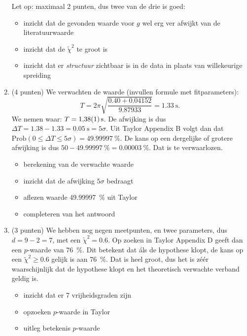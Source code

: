 \documentclass[a4paper,11pt]{article}
\begin{document}
\begin{enumerate}
  Let op: maximaal 2 punten, dus twee van de drie is goed:
  \begin{itemize}
    \item inzicht dat de gevonden waarde voor $g$ wel erg ver afwijkt van de literatuurwaarde
    \item inzicht dat de $\tilde\chi^2$ te groot is
    \item inzicht dat er \emph{structuur} zichtbaar is in de data in plaats van willekeurige spreiding
  \end{itemize}
  \item (4 punten) We verwachten de waarde (invullen formule met fitparameters):
  \begin{equation*}
    T = 2\pi\sqrt{\frac{\num{0,40} + \num{0,04152}}{\num{9,87933}}} = \SI{1,33}{\second}.
  \end{equation*}
  We nemen waar: $T = \SI{1,38 +- 0,01}{\second}$. De afwijking is dus $\Delta T = \num{1,38} - \num{1,33} = \SI{0,05}{\second} = 5\sigma$. Uit Taylor Appendix B volgt dan dat $\text{Prob}(0 \leq \Delta T \leq 5\sigma) = \SI{49,99997}{\percent}.$ De kans op een dergelijke of grotere afwijking is dus $50 - \SI{49,99997}{\percent} = \SI{0,00003}{\percent}$. Dat is te verwaarlozen.
  \begin{itemize}
    \item berekening van de verwachte waarde
    \item inzicht dat de afwijking $5\sigma$ bedraagt
    \item aflezen waarde \SI{49,99997}{\percent} uit Taylor
    \item completeren van het antwoord
  \end{itemize}
  \item (3 punten) We hebben nog negen meetpunten, en twee parameters, dus $d = 9 - 2 = 7$, met een $\tilde\chi^2 = \num{0,6}$. Op zoeken in Taylor Appendix D geeft dan een $p$-waarde van \SI{76}{\percent}. Dit betekent dat áls de hypothese klopt, de kans op een $\tilde\chi^2 \geq \num{0,6}$ gelijk is aan \SI{76}{\percent}. Dat is heel groot, dus het is zéér waarschijnlijk dat de hypothese klopt en het theoretisch verwachte verband geldig is.
  \begin{itemize}
    \item inzicht dat er 7 vrijheidsgraden zijn
    \item opzoeken $p$-waarde in Taylor
    \item uitleg betekenis $p$-waarde
  \end{itemize}
\end{enumerate}
\end{document}
